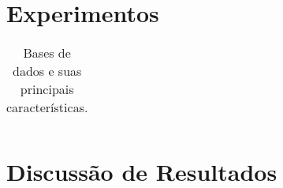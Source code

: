 \begin{comment}
\subsection{Base de Dados das Disciplinas UFES \textit{(Português)} \label{disciplinas-ufes-db}
Essa base de dados foi coletada de algumas disciplinas ministradas na Universidade Federal do Espírito Santo - UFES entre 2015 e 2016 através do Moodle do Laboratório Computação de Alto Desempenho - LCAD. Entre as disciplinas estão Metodologia e Técnicas de Pesquisa Científica, Filosofia e Tecnologia da Informação II. Totalizando 45 atividades, neste \textit{dataset} foram recebidas 1162 submissões com média 25,82 e desvio padrão de 13,54 respostas por atividade.

O diferencial dessa base de dados é a mudança de características nas respostas encontradas nas múltiplas disciplinas, professores e alunos. Observam-se alterações consideráveis quanto ao tamanho, número de grupos, critério avaliativo ou objetividade. 
\end{comment}


\section{Experimentos} %

\begin{table}[h]
\begin{center}
\begin{tabular}{r |c c c c} 

\end{tabular}
\end{center}
\caption{Bases de dados e suas principais caracter{\'i}sticas.}
\label{tb-datasets}
\end{table}


\section{Discussão de Resultados}